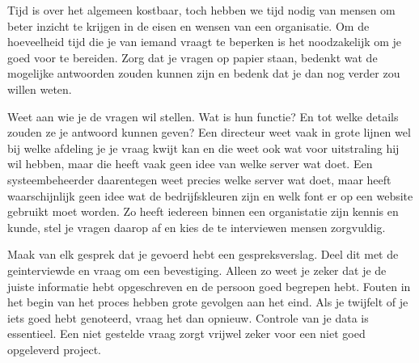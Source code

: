 
Tijd is over het algemeen kostbaar, toch hebben we tijd nodig van mensen om beter inzicht te krijgen in de eisen en wensen van een organisatie. Om de hoeveelheid tijd die je van iemand vraagt te beperken is het noodzakelijk om je goed voor te bereiden. Zorg dat je vragen op papier staan, bedenkt wat de mogelijke antwoorden zouden kunnen zijn en bedenk dat je dan nog verder zou willen weten.

Weet aan wie je de vragen wil stellen. Wat is hun functie? En tot welke details zouden ze je antwoord kunnen geven? Een directeur weet vaak in grote lijnen wel bij welke afdeling je je vraag kwijt kan en die weet ook wat voor uitstraling hij wil hebben, maar die heeft vaak geen idee van welke server wat doet. Een systeembeheerder daarentegen weet precies welke server wat doet, maar heeft waarschijnlijk geen idee wat de bedrijfskleuren zijn en welk font er op een website gebruikt moet worden. Zo heeft iedereen binnen een organistatie zijn kennis en kunde, stel je vragen daarop af en kies de te interviewen mensen zorgvuldig.

Maak van elk gesprek dat je gevoerd hebt een gespreksverslag. Deel dit met de geinterviewde en vraag om een bevestiging. Alleen zo weet je zeker dat je de juiste informatie hebt opgeschreven en de persoon goed begrepen hebt. Fouten in het begin van het proces hebben grote gevolgen aan het eind. Als je twijfelt of je iets goed hebt genoteerd, vraag het dan opnieuw. Controle van je data is essentieel. Een niet gestelde vraag zorgt vrijwel zeker voor een niet goed opgeleverd project.
